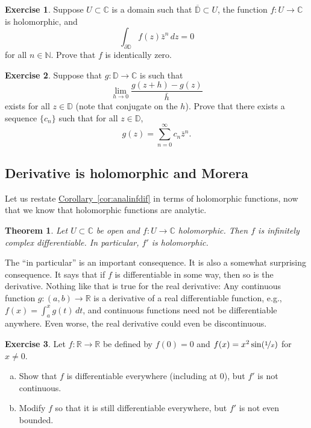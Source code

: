 \documentclass[12pt,openany]{book}
\newcommand{\C}{{\mathbb{C}}}
\newcommand{\R}{{\mathbb{R}}}
\newcommand{\N}{{\mathbb{N}}}
\newcommand{\D}{{\mathbb{D}}}
\newcommand{\myquote}[1]{``#1''}
\theoremstyle{plain}
\newtheorem{thm}{Theorem}[section]
\theoremstyle{remark}
\theoremstyle{definition}
\newenvironment{exbox}{%
    \def\FrameCommand{\vrule width 1pt \relax\hspace{10pt}}%
    \MakeFramed{\advance\hsize-\width\FrameRestore}%
}{%
    \endMakeFramed
}
\newenvironment{exparts}{%
    \leavevmode\begin{enumerate}[a),noitemsep,topsep=0pt,parsep=0pt,partopsep=0pt]
}{%
    \end{enumerate}
}
\theoremstyle{exercise}
\newtheorem{exercise}{Exercise}[section]
\theoremstyle{example}
\newcommand{\corref}[1]{\hyperref[#1]{Corollary~\ref*{#1}}}
\begin{document}
\begin{exbox}
\begin{exercise}
Suppose $U \subset \C$ is a domain such that $\overline{\D} \subset U$,
the function $f \colon U \to \C$ is holomorphic, and
\begin{equation*}
\int_{\partial \D} f(z) \bar{z}^n \, dz = 0
\end{equation*}
for all $n \in \N$.  Prove that $f$ is identically zero.
\end{exercise}

\begin{exercise}
Suppose that $g \colon \D \to \C$ is such that
\begin{equation*}
\lim_{h \to 0}
\frac{g(z+h)-g(z)}{\bar{h}}
\end{equation*}
exists for all $z \in \D$ (note that conjugate on the $h$).
Prove that there exists
a sequence $\{ c_n \}$ such that for all $z \in \D$,
\begin{equation*}
g(z) = \sum_{n=0}^\infty c_n \bar{z}^n .
\end{equation*}
\end{exercise}
\end{exbox}

\subsection{Derivative is holomorphic and Morera}

Let us restate \corref{cor:analinfdif} in terms of
holomorphic functions, now that we know that holomorphic functions are
analytic.

\begin{thm} \label{thm:holfuncinfder}
Let $U \subset \C$ be open and $f \colon U \to \C$ holomorphic.  Then
$f$ is infinitely complex differentiable.  In particular, $f'$ is
holomorphic.
\end{thm}

The \myquote{in particular} is an important consequence.  It is also a somewhat
surprising consequence.
It says that if $f$ is differentiable in some way,
then so is the derivative.  Nothing like that is true for the real
derivative:
Any continuous function $g \colon (a,b) \to \R$ is a derivative
of a real differentiable function, e.g., $f(x) = \int_a^x g(t)\,dt$,
and continuous functions need not be differentiable anywhere.
Even worse, the real derivative could even be discontinuous.

\begin{exbox}
\begin{exercise}
Let $f \colon \R \to \R$ be defined by $f(0) = 0$ and $f(x) = x^2
\sin( \nicefrac{1}{x} )$ for $x \not= 0$.
\begin{exparts}
\item
Show that $f$ is
differentiable everywhere (including at $0$), but $f'$ is not continuous.
\item
Modify $f$ so that it is still differentiable everywhere, but $f'$ is not
even bounded.
\end{exparts}
\end{exercise}
\end{exbox}
\end{document}

